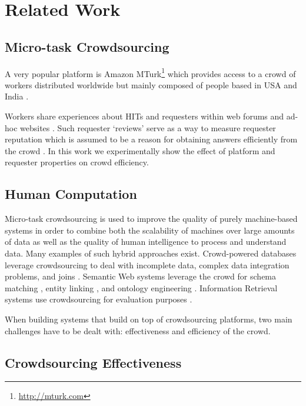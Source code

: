 \section{Related Work}\label{sec:relwork}

\subsection{Micro-task Crowdsourcing}

A very popular platform is Amazon MTurk\footnote{\url{http://mturk.com}} which provides access to a crowd of workers distributed worldwide but mainly composed of people based in USA and India \cite{mturk}.

Workers share experiences about HITs and requesters within web forums and ad-hoc websites \cite{turkopticon}. Such requester `reviews' serve as a way to measure requester reputation which is assumed to be a reason for obtaining answers efficiently from the crowd \cite{}. In this work we experimentally show the effect of platform and requester properties on crowd efficiency.  


\subsection{Human Computation}
Micro-task crowdsourcing is used to improve the quality of purely machine-based systems in order to combine both the scalability of machines over large amounts of data as well as the quality of human intelligence to process and understand data.
Many examples of such hybrid approaches exist.
Crowd-powered databases \cite{crowddb} leverage crowdsourcing to deal with incomplete data, complex data integration problems, and joins \cite{crowder,crowdjoins}.
Semantic Web systems leverage the crowd for schema matching \cite{crowdmap}, entity linking \cite{zencrowd}, and ontology engineering \cite{bioonto}.
Information Retrieval systems use crowdsourcing for evaluation purposes \cite{mizzaroalonso}.

When building systems that build on top of crowdsourcing platforms, two main challenges have to be dealt with: effectiveness and efficiency  of the crowd.

\subsection{Crowdsourcing Effectiveness}

